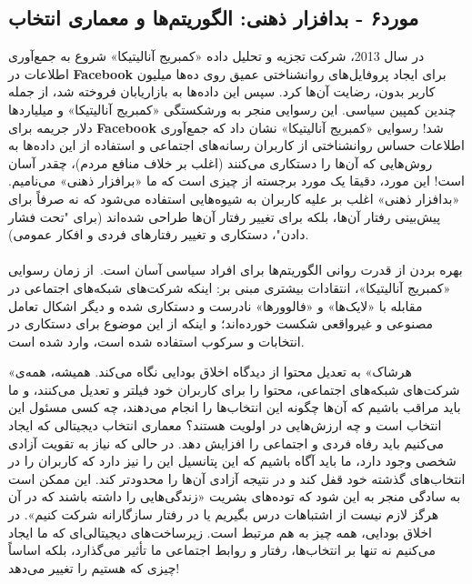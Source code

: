 \subsection*{مورد۶ - بدافزار ذهنی: الگوریتم‌ها و معماری انتخاب}
\label{subsec:مورد۶ - بدافزار ذهنی: الگوریتم‌ها و معماری انتخاب}
در سال 2013، شرکت تجزیه و تحلیل داده «کمبریج آنالیتیکا» شروع به جمع‌آوری اطلاعات در \textenglish{\textbf{Facebook}} برای ایجاد پروفایل‌های روانشناختی عمیق روی ده‌ها میلیون کاربر بدون، رضایت آن‌ها کرد.
سپس این داده‌ها به بازاریابان فروخته شد، از جمله چندین کمپین سیاسی.
این رسوایی منجر به ورشکستگی «کمبریج آنالیتیکا» و میلیاردها دلار جریمه برای \textenglish{\textbf{Facebook}} شد!
رسوایی «کمبریج آنالیتیکا» نشان داد که جمع‌آوری اطلاعات حساس روانشناختی از کاربران رسانه‌های اجتماعی و استفاده از این داده‌ها به روش‌هایی که آن‌ها را دستکاری می‌کنند (اغلب بر خلاف منافع مردم)، چقدر آسان است!
این مورد، دقیقا یک مورد برجسته از چیزی است که ما «برافزار ذهنی» می‌نامیم.
«بدافزار ذهنی» اغلب بر علیه کاربران به شیوه‌هایی استفاده می‌شود که نه صرفاً برای پیش‌بینی رفتار آن‌ها، بلکه برای تغییر رفتار آن‌ها طراحی شده‌اند (برای "تحت فشار دادن"، دستکاری و تغییر رفتارهای فردی و افکار عمومی).

\paragraph{}
بهره بردن از قدرت روانی الگوریتم‌ها برای افراد سیاسی آسان است.\     از زمان رسوایی «کمبریج آنالیتیکا»، انتقادات بیشتری مبنی بر: اینکه شرکت‌های شبکه‌های اجتماعی در مقابله با «لایک‌ها» و «فالوورها» نادرست و دستکاری شده و دیگر اشکال تعامل مصنوعی و غیرواقعی شکست خورده‌اند؛ و اینکه از این موضوع برای دستکاری در انتخابات و سرکوب استفاده شده است، وارد شده است.

«هرشاک» به تعدیل محتوا از دیدگاه اخلاق بودایی نگاه می‌کند.
همیشه، همه‌ی شرکت‌های شبکه‌های اجتماعی، محتوا را برای کاربران خود فیلتر و تعدیل می‌کنند، و ما باید مراقب باشیم که آن‌ها چگونه این انتخاب‌ها را انجام می‌دهند، چه کسی مسئول این انتخاب است و چه ارزش‌هایی در اولویت هستند؟ معماری انتخاب دیجیتالی که ایجاد می‌کنیم باید رفاه فردی و اجتماعی را افزایش دهد.
در حالی که نیاز به تقویت آزادی شخصی وجود دارد، ما باید آگاه باشیم که این پتانسیل این را نیز دارد که کاربران را در انتخاب‌های گذشته خود قفل کند و در نتیجه آزادی آن‌ها را محدودتر کند.
این ممکن است به سادگی منجر به این شود که توده‌های بشریت «زندگی‌هایی را داشته باشند که در آن هرگز لازم نیست از اشتباهات درس بگیریم یا در رفتار سازگارانه شرکت کنیم».
در اخلاق بودایی، همه چیز به هم مرتبط است.
زیرساخت‌های دیجیتالی‌ای که ما ایجاد می‌کنیم نه تنها بر انتخاب‌ها، رفتار و روابط اجتماعی ما تأثیر می‌گذارد، بلکه اساساً چیزی که هستیم را تغییر می‌دهد!

